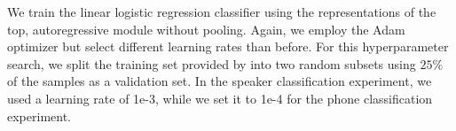 \documentclass{article}
\begin{document}
We train the linear logistic regression classifier using the representations of the top, autoregressive module without pooling. Again, we employ the Adam optimizer but select different learning rates than before. For this hyperparameter search, we split the training set provided by \citet{oord2018representation} into two random subsets using $25\%$ of the samples as a validation set. In the speaker classification experiment, we used a learning rate of 1e-3, while we set it to 1e-4 for the phone classification experiment.
















%
 
\end{document}
